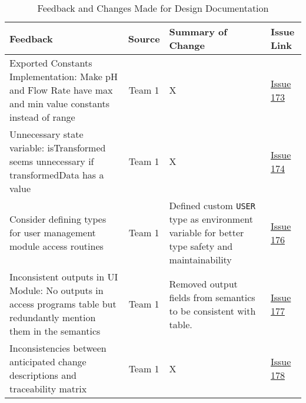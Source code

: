 \documentclass{article}
\begin{document}
\begin{table}[H]
\centering
\begin{tabularx}{\textwidth}{|X|c|X|p{1.5cm}|}
    \hline
    \textbf{Feedback} & \textbf{Source} & \textbf{Summary of Change} &
    \textbf{Issue Link} \\
    \hline
    Exported Constants Implementation: Make pH and Flow Rate have max and min
    value constants instead of range & Team 1 & X &
    \href{https://github.com/SumanyaG/Alkalytics/issues/173}{Issue 173} \\
    \hline
    Unnecessary state variable: isTransformed seems unnecessary if
    transformedData has a value & Team 1 & X
    &\href{https://github.com/SumanyaG/Alkalytics/issues/174}{Issue 174} \\
    \hline
    Consider defining types for user management module access routines & Team 1
    & Defined custom \texttt{USER} type as environment variable for better type
    safety and maintainability &
    \href{https://github.com/SumanyaG/Alkalytics/issues/176}{Issue 176} \\
    \hline
    Inconsistent outputs in UI Module: No outputs in access programs table but
    redundantly mention them in the semantics & Team 1 & Removed output fields
    from semantics to be consistent with table. &
    \href{https://github.com/SumanyaG/Alkalytics/issues/177}{Issue 177} \\
    \hline
    Inconsistencies between anticipated change descriptions and traceability
    matrix & Team 1 & X &
    \href{https://github.com/SumanyaG/Alkalytics/issues/178}{Issue 178} \\
    \hline
\end{tabularx}
\caption{Feedback and Changes Made for Design Documentation}
\label{table:Design2}
\end{table}
\end{document}
